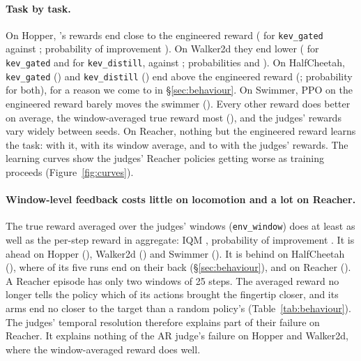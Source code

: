 \paragraph{Task by task.} On Hopper, \kev{}'s rewards end close to the engineered reward ( for
\texttt{kev\_gated} against ; probability of improvement ). On Walker2d
they end lower ( for \texttt{kev\_gated} and  for
\texttt{kev\_distill}, against ; probabilities  and
). On HalfCheetah, \texttt{kev\_gated} () and
\texttt{kev\_distill} () end above the engineered reward (; probability
 for both), for a reason we come to in \S\ref{sec:behaviour}. On Swimmer, PPO on the
engineered reward barely moves the swimmer (). Every other reward does better on average, the
window-averaged true reward most (), and the judges' rewards vary widely between seeds. On
Reacher, nothing but the engineered reward learns the task:  with it, 
with its window average, and  to  with the judges' rewards. The
learning curves show the judges' Reacher policies getting worse as training proceeds (Figure~\ref{fig:curves}).

\paragraph{Window-level feedback costs little on locomotion and a lot on Reacher.} The true reward averaged over the
judges' windows (\texttt{env\_window}) does at least as well as the per-step reward in aggregate: IQM
 , probability of improvement
. It is ahead on Hopper (), Walker2d ()
and Swimmer (). It is behind on HalfCheetah (), where
 of its five runs end on their back (\S\ref{sec:behaviour}), and on Reacher
(). A Reacher episode has only two windows of 25 steps. The averaged reward no longer
tells the policy which of its actions brought the fingertip closer, and its arms end no closer to the target than a
random policy's (Table~\ref{tab:behaviour}). The judges' temporal resolution therefore explains part of their failure
on Reacher. It explains nothing of the AR judge's failure on Hopper and Walker2d, where the window-averaged reward does
well.

